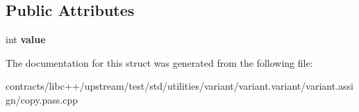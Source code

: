 \subsection*{Public Attributes}
\begin{DoxyCompactItemize}
\item 
\mbox{\label{struct_t_copy_assign_n_t_move_assign_a7e135ccecc4d41ced01151f2958d2ec9}} 
int {\bfseries value}
\end{DoxyCompactItemize}


The documentation for this struct was generated from the following file\+:\begin{DoxyCompactItemize}
\item 
contracts/libc++/upstream/test/std/utilities/variant/variant.\+variant/variant.\+assign/copy.\+pass.\+cpp\end{DoxyCompactItemize}
